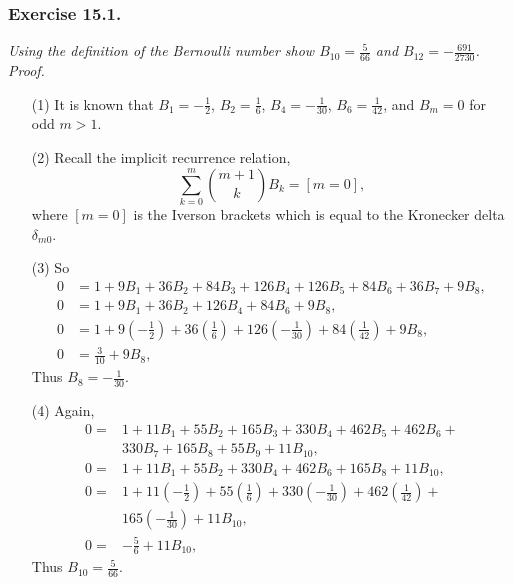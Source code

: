 \documentclass{article}
\begin{document}



\subsubsection*{Exercise 15.1.}
\emph{Using the definition of the Bernoulli number show
$B_{10} = \frac{5}{66}$ and $B_{12} = -\frac{691}{2730}$.} \\

\emph{Proof.}
\begin{enumerate}
\item[(1)]
It is known that
$B_1 = -\frac{1}{2}$,
$B_2 = \frac{1}{6}$,
$B_4 = -\frac{1}{30}$,
$B_6 = \frac{1}{42}$,
and $B_m = 0$ for odd $m > 1$.
\item[(2)]
Recall the implicit recurrence relation,
$$\sum_{k = 0}^{m} {m+1 \choose k} B_k = [m = 0],$$
where $[m = 0]$ is the Iverson brackets which is equal to
the Kronecker delta $\delta_{m0}$.
\item[(3)]
So
\begin{align*}
0 &= 1 + 9 B_1 + 36 B_2 + 84 B_3 + 126 B_4 + 126 B_5 + 84 B_6 + 36 B_7 + 9 B_8, \\
0 &= 1 + 9 B_1 + 36 B_2 + 126 B_4 + 84 B_6 + 9 B_8, \\
0 &= 1 + 9 \left( -\frac{1}{2} \right)
+ 36 \left( \frac{1}{6} \right)
+ 126 \left( -\frac{1}{30} \right)
+ 84 \left( \frac{1}{42} \right)
+ 9 B_8, \\
0 &= \frac{3}{10} + 9B_8,
\end{align*}
Thus $B_8 = -\frac{1}{30}$. \\
\item[(4)]
Again,
\begin{align*}
0 =& 1 + 11 B_1 + 55 B_2 + 165 B_3 + 330 B_4 + 462 B_5 + 462 B_6 + \\
   & 330 B_7 + 165 B_8 + 55 B_9 + 11 B_{10}, \\
0 =& 1 + 11 B_1 + 55 B_2 + 330 B_4 + 462 B_6 + 165 B_8 + 11 B_{10}, \\
0 =& 1 + 11 \left( -\frac{1}{2} \right) +
     55 \left( \frac{1}{6} \right) +
     330 \left( -\frac{1}{30} \right) +
     462 \left( \frac{1}{42} \right) + \\
   & 165 \left( -\frac{1}{30} \right) +
     11 B_{10}, \\
0 =& -\frac{5}{6} + 11 B_{10},
\end{align*}
Thus $B_{10} = \frac{5}{66}$. \\

\end{enumerate}
\end{document}
